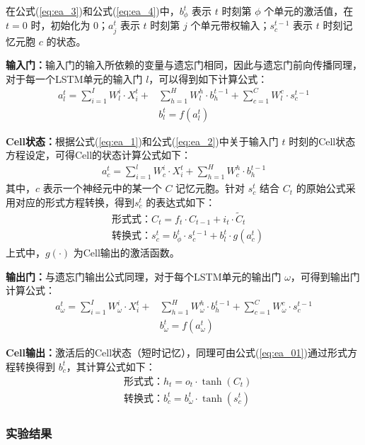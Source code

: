 在公式(\ref{eq:ea_3})和公式(\ref{eq:ea_4})中，$b_\phi^t$ 表示 $t$ 时刻第 $\phi$ 个单元的激活值，在 $t=0$ 时，初始化为 $0$；$a_j^t$ 表示 $t$ 时刻第 $j$ 个单元带权输入；$s_c^{t-1}$ 表示 $t$ 时刻记忆元胞 $c$ 的状态。

\textbf{输入门：}输入门的输入所依赖的变量与遗忘门相同，因此与遗忘门前向传播同理，对于每一个LSTM单元的输入门 $l$，可以得到如下计算公式：
\begin{align}
    a_l^t=\sum_{i=1}^IW^i_{l} \cdot X_i^t+&\sum_{h=1}^HW^h_{l} \cdot b_h^{t-1}+\sum_{c=1}^CW^c_{l} 
\cdot s_c^{t-1} \\
    &b_l^t=f(a_l^t)
\end{align}




\textbf{Cell状态：}根据公式(\ref{eq:ea_1})和公式(\ref{eq:ea_2})中关于输入门 $t$ 时刻的Cell状态方程设定，可得Cell的状态计算公式如下：
\begin{align}
    a_c^t=\sum_{i=1}^lW^i_{c} \cdot X_i^t+\sum_{h=1}^HW^h_{c} \cdot b_h^{t-1}
\end{align}
其中，$c$ 表示一个神经元中的某一个 $C$ 记忆元胞。针对 $s_c^t$ 结合 $C_t$ 的原始公式采用对应的形式方程转换，得到$s^t_c$ 的表达式如下：
\begin{align}
    &\text{形式式：} C_t = f_t\cdot C_{t-1}+ i_t\cdot\widetilde{C}_t \\
    &\text{转换式：} s_c^t = b_\phi^t\cdot s_c^{t-1} + b_l^t\cdot g(a_c^t) 
\end{align}
上式中，$g(\cdot)$ 为Cell输出的激活函数。

\textbf{输出门：}与遗忘门输出公式同理，对于每个LSTM单元的输出门 $\omega$，可得到输出门计算公式：
\begin{align}
    a_\omega^t=\sum_{i=1}^IW^i_{\omega} \cdot X_i^t+&\sum_{h=1}^HW^h_{\omega} \cdot b_h^{t-1}+\sum_{c=1}^CW^c_{\omega} \cdot s_c^{t-1} \\
    &b_\omega^t=f(a_\omega^t)
\end{align}

\textbf{Cell输出：}激活后的Cell状态（短时记忆），同理可由公式(\ref{eq:ea_01})通过形式方程转换得到 $b^t_c$，其计算公式如下：
\begin{align}
    &\text{形式式：} h_t = o_t\cdot \tanh(C_t) \\
    &\text{转换式：} b_c^t = b_\omega^t \cdot \tanh(s_c^t)
\end{align}


\subsubsection{实验结果}


